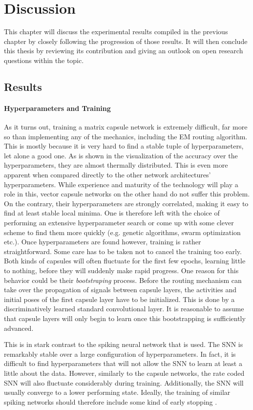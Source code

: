 \chapter{Discussion}\label{chapter:discussion}
This chapter will discuss the experimental results compiled in the previous chapter by closely following the progression of those results. It will then conclude this thesis by reviewing its contribution and giving an outlook on open research questions within the topic.
\section{Results}
\subsubsection{Hyperparameters and Training}
As it turns out, training a matrix capsule network is extremely difficult, far more so than implementing any of the mechanics, including the EM routing algorithm. This is mostly because it is very hard to find a stable tuple of hyperparameters, let alone a good one. As is shown in the visualization of the accuracy over the hyperparameters, they are almost thermally distributed. This is even more apparent when compared directly to the other network architectures’ hyperparameters. While experience and maturity of the technology will play a role in this, vector capsule networks on the other hand do not suffer this problem. On the contrary, their hyperparameters are strongly correlated, making it easy to find at least stable local minima. One is therefore left with the choice of performing an extensive hyperparameter search or come up with some clever scheme to find them more quickly (e.g. genetic algorithms, swarm optimization etc.).  Once hyperparameters are found however, training is rather straightforward. Some care has to be taken not to cancel the training too early. Both kinds of capsules will often fluctuate for the first few epochs, learning little to nothing, before they will suddenly make rapid progress. One reason for this behavior could be their \emph{bootstraping} process. Before the routing mechanism can take over the propagation of signals between capsule layers, the activities and initial poses of the first capsule layer have to be initialized. This is done by a discriminatively learned standard convolutional layer. It is reasonable to assume that capsule layers will only begin to learn once this bootstrapping is sufficiently advanced.

This is in stark contrast to the spiking neural network that is used. The SNN is remarkably stable over a large configuration of hyperparameters. In fact, it is difficult to find hyperparameters that will not allow the SNN to learn at least a little about the data. However, similarly to the capsule networks, the rate coded SNN will also fluctuate considerably during training. Additionally, the SNN will usually converge to a lower performing state. Ideally, the training of similar spiking networks should therefore include some kind of early stopping \cite{ prechelt1998automatic}.

